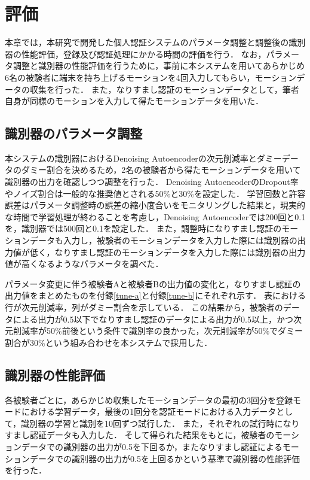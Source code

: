 \chapter{評価}
本章では，本研究で開発した個人認証システムのパラメータ調整と調整後の識別器の性能評価，登録及び認証処理にかかる時間の評価を行う．
なお，パラメータ調整と識別器の性能評価を行うために，事前に本システムを用いてあらかじめ6名の被験者に端末を持ち上げるモーションを4回入力してもらい，モーションデータの収集を行った．
また，なりすまし認証のモーションデータとして，筆者自身が同様のモーションを入力して得たモーションデータを用いた．

\section{識別器のパラメータ調整}
本システムの識別器におけるDenoising Autoencoderの次元削減率とダミーデータのダミー割合を決めるため，2名の被験者から得たモーションデータを用いて識別器の出力を確認しつつ調整を行った．
Denoising AutoencoderのDropout率やノイズ割合は一般的な推奨値とされる50\%と30\%を設定した．
学習回数と許容誤差はパラメータ調整時の誤差の縮小度合いをモニタリングした結果と，現実的な時間で学習処理が終わることを考慮し，Denoising Autoencoderでは200回と0.1を，識別器では500回と0.1を設定した．
また，調整時になりすまし認証のモーションデータも入力し，被験者のモーションデータを入力した際には識別器の出力値が低く，なりすまし認証のモーションデータを入力した際には識別器の出力値が高くなるようなパラメータを調べた．

パラメータ変更に伴う被験者Aと被験者Bの出力値の変化と，なりすまし認証の出力値をまとめたものを付録\ref{tune-a}と付録\ref{tune-b}にそれぞれ示す．
表における行が次元削減率，列がダミー割合を示している．
この結果から，被験者のデータによる出力が0.5以下でなりすまし認証のデータによる出力が0.5以上，かつ次元削減率が50\%前後という条件で識別率の良かった，次元削減率が50\%でダミー割合が30\%という組み合わせを本システムで採用した．

\section{識別器の性能評価}
各被験者ごとに，あらかじめ収集したモーションデータの最初の3回分を登録モードにおける学習データ，最後の1回分を認証モードにおける入力データとして，識別器の学習と識別を10回ずつ試行した．
また，それぞれの試行時になりすまし認証データも入力した．
そして得られた結果をもとに，被験者のモーションデータでの識別器の出力が0.5を下回るか，またなりすまし認証によるモーションデータでの識別器の出力が0.5を上回るかという基準で識別器の性能評価を行った．

